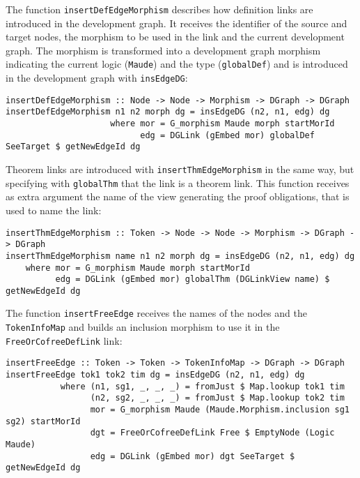 The function \verb"insertDefEdgeMorphism" describes how definition links
are introduced in the
development graph. It receives the identifier of the source and target
nodes, the morphism to be used in the link and the current development
graph. The morphism is transformed into a development graph morphism
indicating the current logic (\verb"Maude") and the type (\verb"globalDef")
and is introduced in the development graph with \verb"insEdgeDG":

{\codesize
\begin{verbatim}
insertDefEdgeMorphism :: Node -> Node -> Morphism -> DGraph -> DGraph
insertDefEdgeMorphism n1 n2 morph dg = insEdgeDG (n2, n1, edg) dg
                     where mor = G_morphism Maude morph startMorId
                           edg = DGLink (gEmbed mor) globalDef SeeTarget $ getNewEdgeId dg
\end{verbatim}
}

Theorem links are introduced with \verb"insertThmEdgeMorphism"
in the same way, but specifying with
\verb"globalThm" that the link is a theorem link. This function receives
as extra argument the name of the view generating the proof obligations,
that is used to name the link:

{\codesize
\begin{verbatim}
insertThmEdgeMorphism :: Token -> Node -> Node -> Morphism -> DGraph -> DGraph
insertThmEdgeMorphism name n1 n2 morph dg = insEdgeDG (n2, n1, edg) dg
    where mor = G_morphism Maude morph startMorId
          edg = DGLink (gEmbed mor) globalThm (DGLinkView name) $ getNewEdgeId dg
\end{verbatim}
}

The function \verb"insertFreeEdge" receives the names of the nodes and
the \verb"TokenInfoMap" and builds an inclusion morphism to use it in
the \verb"FreeOrCofreeDefLink" link:

{\codesize
\begin{verbatim}
insertFreeEdge :: Token -> Token -> TokenInfoMap -> DGraph -> DGraph
insertFreeEdge tok1 tok2 tim dg = insEdgeDG (n2, n1, edg) dg
           where (n1, sg1, _, _, _) = fromJust $ Map.lookup tok1 tim
                 (n2, sg2, _, _, _) = fromJust $ Map.lookup tok2 tim
                 mor = G_morphism Maude (Maude.Morphism.inclusion sg1 sg2) startMorId
                 dgt = FreeOrCofreeDefLink Free $ EmptyNode (Logic Maude)
                 edg = DGLink (gEmbed mor) dgt SeeTarget $ getNewEdgeId dg
\end{verbatim}
}























